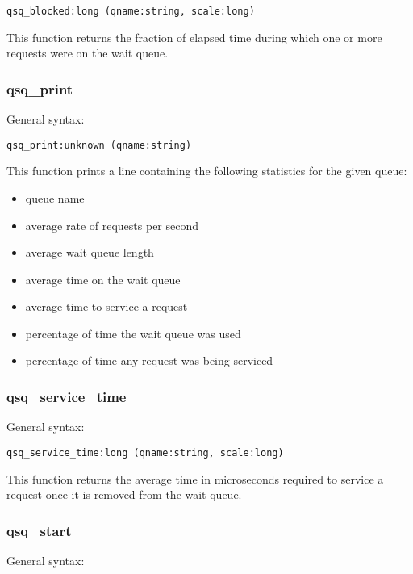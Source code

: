 \documentclass[twoside,english]{article}
\newenvironment{vindent}
{\begin{list}{}{\setlength{\listparindent}{6pt}}
\item[]}
{\end{list}}
\begin{document}
\begin{vindent}
\begin{verbatim}
qsq_blocked:long (qname:string, scale:long)
\end{verbatim}
\end{vindent}
This function returns the fraction of elapsed time during which one or more
requests were on the wait queue.


\subsubsection{qsq\_print}
General syntax:

\begin{vindent}
\begin{verbatim}
qsq_print:unknown (qname:string)
\end{verbatim}
\end{vindent}
This function prints a line containing the following statistics for the given
queue:

\begin{itemize}
\item queue name
\item average rate of requests per second
\item average wait queue length
\item average time on the wait queue
\item average time to service a request
\item percentage of time the wait queue was used
\item percentage of time any request was being serviced
\end{itemize}

\subsubsection{qsq\_service\_time}
General syntax:

\begin{vindent}
\begin{verbatim}
qsq_service_time:long (qname:string, scale:long)
\end{verbatim}
\end{vindent}
This function returns the average time in microseconds required to service
a request once it is removed from the wait queue.


\subsubsection{qsq\_start}
General syntax:
\end{document}
